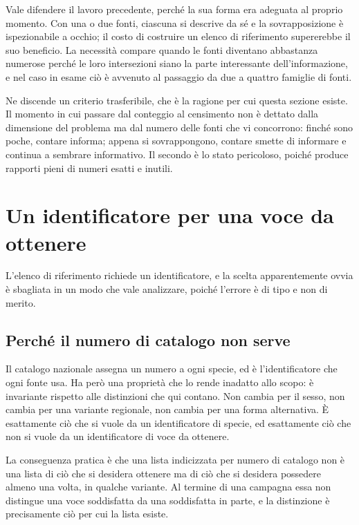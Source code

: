 Vale difendere il lavoro precedente, perché la sua forma era adeguata al proprio momento. Con una o due fonti, ciascuna si descrive da sé e la sovrapposizione è ispezionabile a occhio; il costo di costruire un elenco di riferimento supererebbe il suo beneficio. La necessità compare quando le fonti diventano abbastanza numerose perché le loro intersezioni siano la parte interessante dell'informazione, e nel caso in esame ciò è avvenuto al passaggio da due a quattro famiglie di fonti.

Ne discende un criterio trasferibile, che è la ragione per cui questa sezione esiste. Il momento in cui passare dal conteggio al censimento non è dettato dalla dimensione del problema ma dal numero delle fonti che vi concorrono: finché sono poche, contare informa; appena si sovrappongono, contare smette di informare e continua a sembrare informativo. Il secondo è lo stato pericoloso, poiché produce rapporti pieni di numeri esatti e inutili.

\section{Un identificatore per una voce da ottenere}

L'elenco di riferimento richiede un identificatore, e la scelta apparentemente ovvia è sbagliata in un modo che vale analizzare, poiché l'errore è di tipo e non di merito.

\subsection*{Perché il numero di catalogo non serve}

Il catalogo nazionale assegna un numero a ogni specie, ed è l'identificatore che ogni fonte usa. Ha però una proprietà che lo rende inadatto allo scopo: è invariante rispetto alle distinzioni che qui contano. Non cambia per il sesso, non cambia per una variante regionale, non cambia per una forma alternativa. È esattamente ciò che si vuole da un identificatore di specie, ed esattamente ciò che non si vuole da un identificatore di voce da ottenere.

La conseguenza pratica è che una lista indicizzata per numero di catalogo non è una lista di ciò che si desidera ottenere ma di ciò che si desidera possedere almeno una volta, in qualche variante. Al termine di una campagna essa non distingue una voce soddisfatta da una soddisfatta in parte, e la distinzione è precisamente ciò per cui la lista esiste.

